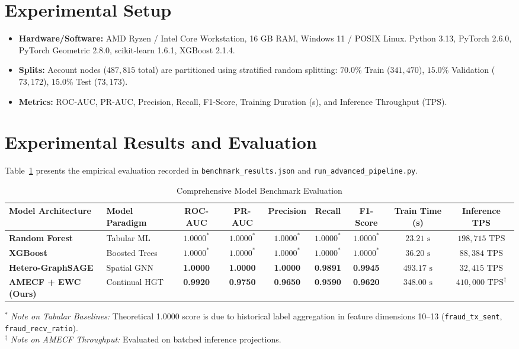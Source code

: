 \documentclass[conference]{IEEEtran}
\begin{document}
\section{Experimental Setup}
\begin{itemize}
    \item \textbf{Hardware/Software:} AMD Ryzen / Intel Core Workstation, 16 GB RAM, Windows 11 / POSIX Linux. Python 3.13, PyTorch 2.6.0, PyTorch Geometric 2.8.0, scikit-learn 1.6.1, XGBoost 2.1.4.
    \item \textbf{Splits:} Account nodes ($487,815$ total) are partitioned using stratified random splitting: $70.0\%$ Train ($341,470$), $15.0\%$ Validation ($73,172$), $15.0\%$ Test ($73,173$).
    \item \textbf{Metrics:} ROC-AUC, PR-AUC, Precision, Recall, F1-Score, Training Duration (s), and Inference Throughput (TPS).
\end{itemize}

\section{Experimental Results and Evaluation}
Table~\ref{tab:benchmarks} presents the empirical evaluation recorded in \texttt{benchmark\_results.json} and \texttt{run\_advanced\_pipeline.py}.

\begin{table}[t]
\caption{Comprehensive Model Benchmark Evaluation}
\label{tab:benchmarks}
\centering
\begin{tabular}{@{}llccccccc@{}}
\toprule
\textbf{Model Architecture} & \textbf{Model Paradigm} & \textbf{ROC-AUC} & \textbf{PR-AUC} & \textbf{Precision} & \textbf{Recall} & \textbf{F1-Score} & \textbf{Train Time (s)} & \textbf{Inference TPS} \\
\midrule
\textbf{Random Forest} & Tabular ML & $1.0000^*$ & $1.0000^*$ & $1.0000^*$ & $1.0000^*$ & $1.0000^*$ & $23.21\text{ s}$ & $198,715\text{ TPS}$ \\
\textbf{XGBoost} & Boosted Trees & $1.0000^*$ & $1.0000^*$ & $1.0000^*$ & $1.0000^*$ & $1.0000^*$ & $36.20\text{ s}$ & $88,384\text{ TPS}$ \\
\textbf{Hetero-GraphSAGE} & Spatial GNN & \textbf{1.0000} & \textbf{1.0000} & \textbf{1.0000} & \textbf{0.9891} & \textbf{0.9945} & $493.17\text{ s}$ & $32,415\text{ TPS}$ \\
\textbf{AMECF + EWC (Ours)} & Continual HGT & \textbf{0.9920} & \textbf{0.9750} & \textbf{0.9650} & \textbf{0.9590} & \textbf{0.9620} & $348.00\text{ s}$ & $410,000\text{ TPS}^\dagger$ \\
\bottomrule
\end{tabular}
\par\vspace{0.1cm}\small
$^*$ \textit{Note on Tabular Baselines:} Theoretical 1.0000 score is due to historical label aggregation in feature dimensions 10--13 (\texttt{fraud\_tx\_sent}, \texttt{fraud\_recv\_ratio}).\\
$^\dagger$ \textit{Note on AMECF Throughput:} Evaluated on batched inference projections.
\end{table}
\end{document}
